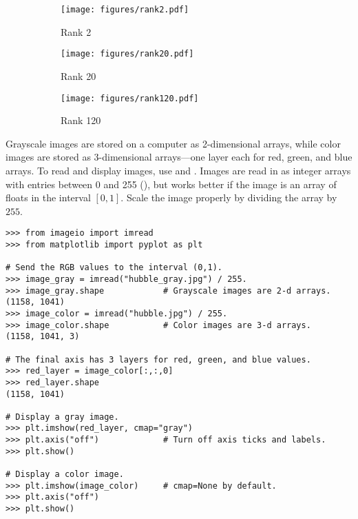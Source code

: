 \begin{figure}[H]
\centering
\begin{subfigure}{.32\textwidth}
    \centering
    \texttt{[image: figures/rank2.pdf]}
    \caption{Rank 2}
\end{subfigure}
%
\begin{subfigure}{.32\textwidth}
    \centering
    \texttt{[image: figures/rank20.pdf]}
    \caption{Rank 20}
    \label{fig:hubble-rank20-approximation}
\end{subfigure}
%
\begin{subfigure}{.32\textwidth}
    \centering
    \texttt{[image: figures/rank120.pdf]}
    \caption{Rank 120}
\end{subfigure}
\caption{}
\label{fig:hubble-svd-rank-approximations}
\end{figure}

Grayscale images are stored on a computer as 2-dimensional arrays, while color images are stored as 3-dimensional arrays---one layer each for red, green, and blue arrays.
To read and display images, use  and .
Images are read in as integer arrays with entries between 0 and 255 (), but  works better if the image is an array of floats in the interval $[0,1]$.
Scale the image properly by dividing the array by $255$.

\begin{lstlisting}
>>> from imageio import imread
>>> from matplotlib import pyplot as plt

# Send the RGB values to the interval (0,1).
>>> image_gray = imread("hubble_gray.jpg") / 255.
>>> image_gray.shape            # Grayscale images are 2-d arrays.
(1158, 1041)
>>> image_color = imread("hubble.jpg") / 255.
>>> image_color.shape           # Color images are 3-d arrays.
(1158, 1041, 3)

# The final axis has 3 layers for red, green, and blue values.
>>> red_layer = image_color[:,:,0]
>>> red_layer.shape
(1158, 1041)

# Display a gray image.
>>> plt.imshow(red_layer, cmap="gray")
>>> plt.axis("off")             # Turn off axis ticks and labels.
>>> plt.show()

# Display a color image.
>>> plt.imshow(image_color)     # cmap=None by default.
>>> plt.axis("off")
>>> plt.show()
\end{lstlisting}

